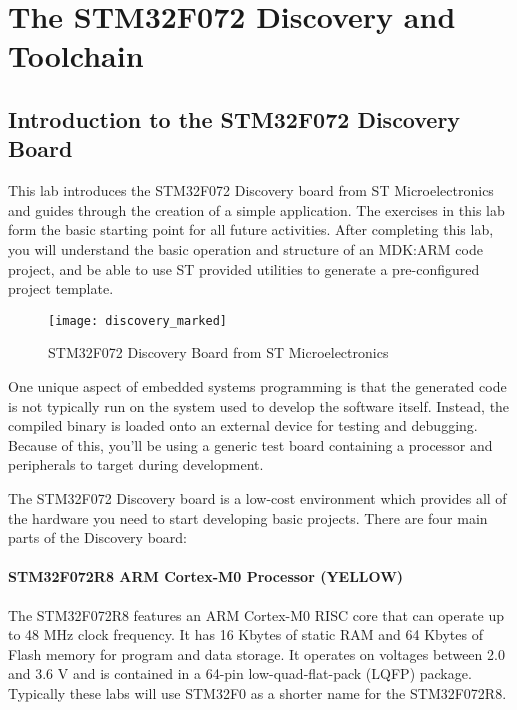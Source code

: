 \documentclass[11pt,fleqn]{book} %
\begin{document}
	



\chapter{The STM32F072 Discovery and Toolchain}
\section{Introduction to the STM32F072 Discovery Board}
This lab introduces the STM32F072 Discovery board from ST Microelectronics and guides through the creation of a simple application. The exercises in this lab form the basic starting point for all future activities. After completing this lab, you will understand the basic operation and structure of an MDK:ARM code project, and be able to use ST provided utilities to generate a pre-configured project template. 

\begin{figure}[h]
	\centering\texttt{[image: discovery\_marked]}
	\caption{STM32F072 Discovery Board from ST Microelectronics}
\end{figure}

One unique aspect of embedded systems programming is that the generated code is not typically run on the system used to develop the software itself. Instead, the compiled binary is loaded onto an external device for testing and debugging. Because of this, you'll be using a generic test board containing a processor and peripherals to target during development. 

The STM32F072 Discovery board is a low-cost environment which provides all of the hardware you need to start developing basic projects. There are four main parts of the Discovery board: 

\subsubsection*{STM32F072R8 ARM Cortex-M0 Processor ({\color{yellow!80!black}YELLOW})}
The STM32F072R8 features an ARM Cortex-M0 RISC core that can operate up to 48 MHz clock frequency. It has 16 Kbytes of static RAM and 64 Kbytes of Flash memory for program and data storage. It operates on voltages between 2.0 and 3.6 V and is contained in a 64-pin low-quad-flat-pack (LQFP) package. Typically these labs will use STM32F0 as a shorter name for the STM32F072R8.
\end{document}
